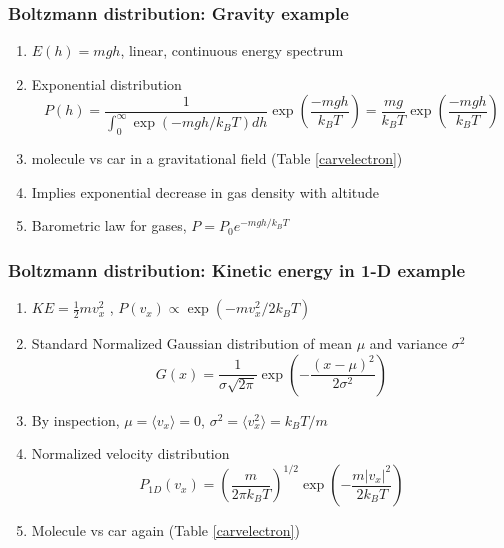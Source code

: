 \documentclass[11pt]{article}
\begin{document}
\subsubsection{Boltzmann distribution: Gravity example}
\label{sec:org9d0d6fa}
\begin{enumerate}
\item \(E(h)=mgh\), linear, continuous energy spectrum
\item Exponential distribution
\[P(h) = \frac{1}{\int_0^\infty \exp\left(-mgh/k_BT\right)dh }\exp\left(\frac{-mgh}{k_BT}\right )  =  \frac{mg}{k_BT}\exp\left(\frac{-mgh}{k_BT}\right)\]
\item molecule vs car in a gravitational field (Table \ref{carvelectron})
\item Implies exponential decrease in gas density with altitude
\item Barometric law for gases, \(P=P_0e^{-mgh/k_BT}\)
\end{enumerate}
\subsubsection{Boltzmann distribution: Kinetic energy in 1-D example}
\label{sec:org3e4e245}
\begin{enumerate}
\item \(KE = \frac{1}{2}m v_x^2\) , \(P(v_x) \propto \exp \left (-m v_x^2/2 k_B T\right )\)
\item Standard Normalized Gaussian distribution of mean \(\mu\) and variance \(\sigma^2\)
\[G(x)=\frac{1}{\sigma\sqrt{2\pi}} \exp\left (
          -\frac{(x-\mu)^2}{2\sigma^2} \right )\]
\item By inspection, \(\mu=\langle v_x \rangle=0\), \(\sigma^2=\langle v_x^2\rangle =k_BT/m\)
\item Normalized velocity distribution
\[P_{1D}(v_x) = \left ( \frac{m}{2\pi k_B T} \right )^{1/2}\exp\left
         (-\frac{m|v_x|^2}{2 k_BT} \right ) \]
\item Molecule vs car again (Table  \ref{carvelectron})
\end{enumerate}
\end{document}
